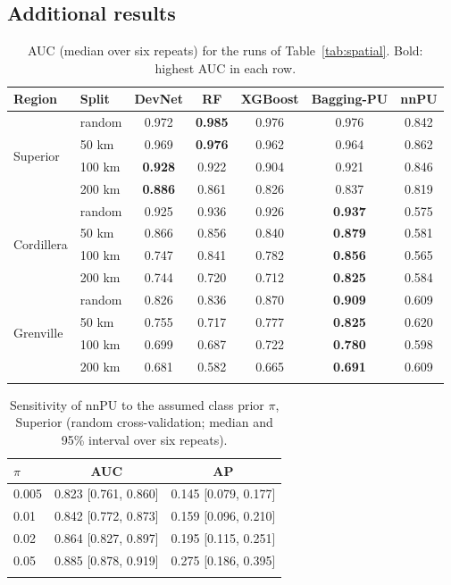 \documentclass[pdflatex,sn-apa]{sn-jnl}
\begin{document}
\begin{appendices}

\section{Additional results}\label{app:full}

\begin{table}[!h]
\caption{AUC (median over six repeats) for the runs of Table~\ref{tab:spatial}. Bold: highest AUC in each row.}\label{tab:spatial-auc}
\footnotesize
\setlength{\tabcolsep}{3pt}
\begin{tabular*}{\textwidth}{@{\extracolsep\fill}llccccc}
\toprule
Region & Split & DevNet & RF & XGBoost & Bagging-PU & nnPU \\
\midrule
\multirow{4}{*}{Superior} & random & 0.972 & \textbf{0.985} & 0.976 & 0.976 & 0.842 \\
 & 50 km & 0.969 & \textbf{0.976} & 0.962 & 0.964 & 0.862 \\
 & 100 km & \textbf{0.928} & 0.922 & 0.904 & 0.921 & 0.846 \\
 & 200 km & \textbf{0.886} & 0.861 & 0.826 & 0.837 & 0.819 \\
\midrule
\multirow{4}{*}{Cordillera} & random & 0.925 & 0.936 & 0.926 & \textbf{0.937} & 0.575 \\
 & 50 km & 0.866 & 0.856 & 0.840 & \textbf{0.879} & 0.581 \\
 & 100 km & 0.747 & 0.841 & 0.782 & \textbf{0.856} & 0.565 \\
 & 200 km & 0.744 & 0.720 & 0.712 & \textbf{0.825} & 0.584 \\
\midrule
\multirow{4}{*}{Grenville} & random & 0.826 & 0.836 & 0.870 & \textbf{0.909} & 0.609 \\
 & 50 km & 0.755 & 0.717 & 0.777 & \textbf{0.825} & 0.620 \\
 & 100 km & 0.699 & 0.687 & 0.722 & \textbf{0.780} & 0.598 \\
 & 200 km & 0.681 & 0.582 & 0.665 & \textbf{0.691} & 0.609 \\
\botrule
\end{tabular*}
\end{table}

\begin{table}[!h]
\caption{Sensitivity of nnPU to the assumed class prior $\pi$, Superior (random cross-validation; median and 95\% interval over six repeats).}\label{tab:prior}
\footnotesize
\begin{tabular*}{0.6\textwidth}{@{\extracolsep\fill}lcc}
\toprule
$\pi$ & AUC & AP \\
\midrule
0.005 & 0.823 [0.761, 0.860] & 0.145 [0.079, 0.177] \\
0.01 & 0.842 [0.772, 0.873] & 0.159 [0.096, 0.210] \\
0.02 & 0.864 [0.827, 0.897] & 0.195 [0.115, 0.251] \\
0.05 & 0.885 [0.878, 0.919] & 0.275 [0.186, 0.395] \\
\botrule
\end{tabular*}
\end{table}


\end{appendices}
\end{document}
